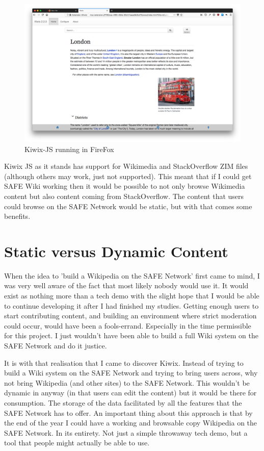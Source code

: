 \documentclass{l4proj}
\begin{document}
\begin{figure}
	\begin{center}
			\includegraphics[width=\textwidth]{images/kiwix-js-extension}
		\caption{Kiwix-JS running in FireFox}
		\label{fig:kiwix-firefox}
	\end{center}
\end{figure}

Kiwix JS as it stands has support for Wikimedia and StackOverflow ZIM files (although others may work, just not supported). This meant that if I could get SAFE Wiki working then it would be possible to not only browse Wikimedia content but also content coming from StackOverflow. The content that users could browse on the SAFE Network would be static, but with that comes some benefits.

\section{Static versus Dynamic Content}

When the idea to 'build a Wikipedia on the SAFE Network' first came to mind, I was very well aware of the fact that most likely nobody would use it. It would exist as nothing more than a tech demo with the slight hope that I would be able to continue developing it after I had finished my studies. Getting enough users to start contributing content, and building an environment where strict moderation could occur, would have been a fools-errand. Especially in the time permissible for this project. I just wouldn't have been able to build a full Wiki system on the SAFE Network and do it justice.

It is with that realisation that I came to discover Kiwix. Instead of trying to build a Wiki system on the SAFE Network and trying to bring users across, why not bring Wikipedia (and other sites) to the SAFE Network. This wouldn't be dynamic in anyway (in that users can edit the content) but it would be there for consumption. The storage of the data facilitated by all the features that the SAFE Network has to offer. An important thing about this approach is that by the end of the year I could have a working and browsable copy Wikipedia on the SAFE Network. In its entirety. Not just a simple throwaway tech demo, but a tool that people might actually be able to use.
\end{document}
